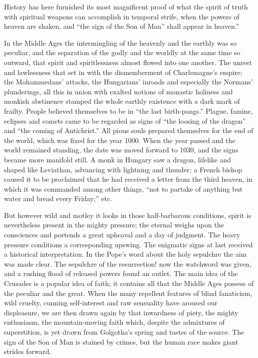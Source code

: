 \documentclass[12pt,a4paper,openany]{book}
\newcommand{\opage}[1]{\marginnote{\footnotesize\textit{[#1]}}}
\begin{document}
History has here furnished its most magnificent proof
of what the spirit of truth with spiritual weapons
can accomplish in temporal strife, when the powers of heaven are shaken,
and ``the sign of the Son of Man'' shall appear in heaven.''

In the Middle Ages the intermingling of the
heavenly and the earthly was so peculiar, and the separation
of the godly and the worldly at the same time so
outward, that spirit and spiritlessness almost flowed into
one another. The unrest and lawlessness that set in with
the dismemberment of Charlemagne's empire; the Mohammedans'
attacks, the Hungarians' inroads and especially the Normans'
plunderings, all this in union with exalted notions
of monastic holiness and monkish abstinence stamped
the whole earthly existence with a dark mark of
frailty. People believed themselves to be in ``the last
birth-pangs.'' Plague, famine, eclipses and comets came to be
regarded as signs of ``the loosing of the dragon'' and ``the coming of
Antichrist.'' All pious souls prepared themselves
for the end of the world, which was fixed for the year 1000.
When the year passed and the world remained standing, the date was moved
forward to 1030, and the signs became more manifold still.
A monk in Hungary saw a dragon, lifelike
and shaped like Leviathan, advancing with lightning and thunder;
a French bishop caused it to be proclaimed that he had
received a letter from the third heaven, in which it was commanded among
other things, ``not to partake of anything but water and bread
every Friday;'' etc.

But however wild and motley it looks in those
half-barbarous conditions, spirit is nevertheless present in the
mighty pressure; the eternal weighs upon the consciences
\setcounter{footnote}{0}%
\opage{49}and portends a great upheaval and a day of judgment.
The heavy pressure conditions a corresponding upswing. The
enigmatic signs at last received a historical interpretation.
In the Pope's word about the holy sepulchre the aim was made clear.
The sepulchre of the resurrection! now the watchword was given, and a rushing
flood of released powers found an outlet. The main idea of the
Crusades is a popular idea of faith; it
contains all that the Middle Ages possess of the peculiar
and the great. When the many repellent features of blind
fanaticism, wild cruelty, cunning self-interest and raw
sensuality have aroused our displeasure, we are then drawn
again by that inwardness of piety, the mighty enthusiasm,
the mountain-moving faith which, despite the admixtures
of superstition, is yet drawn from Golgotha's spring and tastes
of the source. The sign of the Son of Man is stained by crimes,
but the human race makes giant strides forward.
\end{document}
